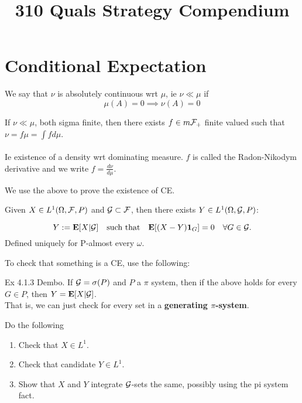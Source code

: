 \documentclass{article}
\title{310 Quals Strategy Compendium}
\begin{document}
\maketitle
\section{Conditional Expectation}
\begin{definition}
We say that $\nu$ is absolutely continuous wrt $\mu$, ie $\nu \ll \mu$ if 
$$\mu(A) = 0 \implies \nu(A) = 0$$
\end{definition}

\begin{theorem}
If $\nu \ll \mu$, both sigma finite, then there exists $f \in m\mathcal F_+$ finite valued such that $\nu = f\mu = \int f d\mu$. 
\\\\
Ie existence of a density wrt dominating measure. $f$ is called the Radon-Nikodym derivative and we write $f = \frac{d\nu}{d\mu}$. 
\end{theorem}
We use the above to prove the existence of CE. 

\begin{definition}
Given $X\in L^1(\Omega,\mathcal F,P)$ and $\mathcal G \subset \mathcal F$, then there exists $Y\in L^1(\Omega,\mathcal G,P)$:

$$Y:=\mathbf{E}[X|\mathcal G] \quad \text{such that} \quad \mathbf{E}[(X-Y)\boldsymbol{1}_G] =0  \quad \forall G\in \mathcal G.$$
Defined uniquely for P-almost every $\omega$.
\end{definition}
To check that something is a CE, use the following:
\begin{theorem}
Ex 4.1.3 Dembo. If $\mathcal G = \sigma(P)$ and $P$ a $\pi$ system, then if the above holds for every $G\in P$, then $Y= \mathbf{E}[X|\mathcal G]$.\\
That is, we can just check for every set in a \textbf{generating $\pi$-system}.
\end{theorem}

\begin{recipe}
Do the following
\begin{enumerate}
	\item Check that $X\in L^1$.
	\item Check that candidate $Y\in L^1$.
	\item Show that $X$ and $Y$ integrate $\mathcal G$-sets the same, possibly using the pi system fact.
\end{enumerate}
\end{recipe}
\end{document}
